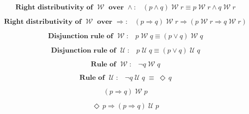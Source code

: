 \documentclass[12pt, fleqn, leqno]{article}
\newcommand{\equivs}{\ensuremath{\;\equiv\;}}       %
\newcommand{\impl}{\ensuremath{\Rightarrow}}        %
\newcommand{\Until}{\;\mathcal{U}\;}
\newcommand{\Wait}{\;\mathcal{W}\;}
\newcommand{\Event}{\Diamond\,}
\newcommand{\spacer}{\vspace{-30pt}}
\begin{document}
\spacer

\begin{equation}\label{E:rightWaitAndDist}
\textbf{Right distributivity of $\Wait$ over $\land$:}\quad (p \land q) \Wait r\equiv p \Wait r \land q \Wait r
\end{equation}

\spacer

\begin{equation}\label{E:rightWaitImplDist}
\textbf{Right distributivity of $\Wait$ over $\impl$:}\quad (p \impl q) \Wait r\impl (p \Wait r \impl q \Wait r)
\end{equation}

\spacer

\begin{equation}\label{E:disjunctWait}
\textbf{Disjunction rule of $\Wait$:}\quad p\Wait q\equiv (p\lor q)\Wait q
\end{equation}

\spacer

\begin{equation}\label{E:disjunctUntil}
\textbf{Disjunction rule of $\Until$:}\quad p\Until q\equiv (p\lor q)\Until q
\end{equation}

\spacer

\begin{equation}\label{E:ruleWait}
\textbf{Rule of $\Wait$:}\quad \neg q \Wait q
\end{equation}

\spacer

\begin{equation}\label{E:ruleUntil}
\textbf{Rule of $\Until$:}\quad \neg q \Until q\equivs \Event q
\end{equation}

\spacer

\begin{equation}\label{E:pImplQWaitP}
(p\impl q)\Wait p
\end{equation}

\spacer

\begin{equation}\label{E:eventPImplPImplUntilp}
\Event p\impl(p\impl q)\Until p
\end{equation}

\spacer
\end{document}

